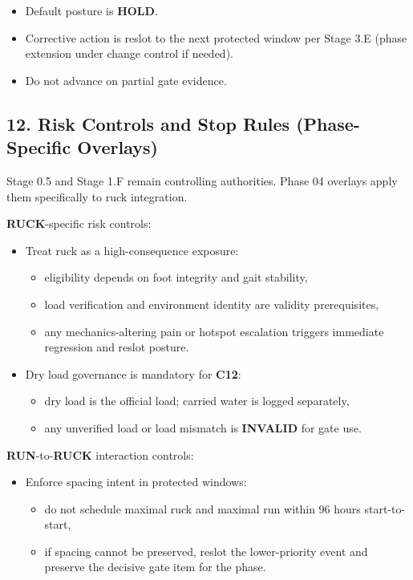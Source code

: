 \documentclass[10pt]{article}
\begin{document}
\begin{itemize}
\item Default posture is \textbf{HOLD}.
\item Corrective action is reslot to the next protected window per Stage 3.E (phase extension under change control if needed).
\item Do not advance on partial gate evidence.
\end{itemize}

\subsection*{12. Risk Controls and Stop Rules (Phase-Specific Overlays)}


Stage 0.5 and Stage 1.F remain controlling authorities. Phase 04 overlays apply them specifically to ruck integration.

\textbf{RUCK}-specific risk controls:

\begin{itemize}
\item Treat ruck as a high-consequence exposure:
  \begin{itemize}
  \item eligibility depends on foot integrity and gait stability,
  \item load verification and environment identity are validity prerequisites,
  \item any mechanics-altering pain or hotspot escalation triggers immediate regression and reslot posture.
  \end{itemize}
\item Dry load governance is mandatory for \textbf{C12}:
  \begin{itemize}
  \item dry load is the official load; carried water is logged separately,
  \item any unverified load or load mismatch is \textbf{INVALID} for gate use.
  \end{itemize}
\end{itemize}

\textbf{RUN}-to-\textbf{RUCK} interaction controls:

\begin{itemize}
\item Enforce spacing intent in protected windows:
  \begin{itemize}
  \item do not schedule maximal ruck and maximal run within 96 hours start-to-start,
  \item if spacing cannot be preserved, reslot the lower-priority event and preserve the decisive gate item for the phase.
  \end{itemize}
\end{itemize}
\end{document}
